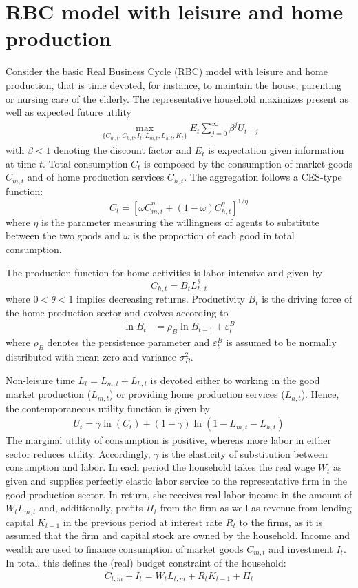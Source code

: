 \documentclass[a4paper]{scrartcl}
\begin{document}
\section{RBC model with leisure and home production}
Consider the basic Real Business Cycle (RBC) model with leisure and home production, that is time devoted, for instance, to maintain the house, parenting or nursing care of the elderly. The representative household maximizes present as well as expected future utility
\begin{align*}
\underset{\{C_{m,t},C_{h,t},I_{t},L_{m,t},L_{h,t},K_{t}\}}{\max} E_t \sum_{j=0}^{\infty} \beta^{j} U_{t+j}
\end{align*}
with $\beta <1$ denoting the discount factor and $E_t$ is expectation given information at time $t$. Total consumption $C_t$ is composed by the consumption of market goods $C_{m,t}$ and of home production services $C_{h,t}$. The aggregation follows a CES-type function:
$$C_t = \left[\omega C_{m,t}^\eta +(1-\omega)C_{h,t}^\eta\right]^{1/\eta}$$
where $\eta$ is the parameter measuring the willingness of agents to substitute between the two goods and $\omega$ is the proportion of each good in total consumption. 

The production function for home activities is labor-intensive and given by
$$C_{h,t}=B_t L_{h,t}^\theta$$
where $0<\theta<1$ implies decreasing returns. Productivity $B_t$ is the driving force of the home production sector and evolves according to
\begin{align*}
\ln{B_{t}} &= \rho_B \ln{B_{t-1}}  + \varepsilon_t^B
\end{align*}
where $\rho_B$ denotes the persistence parameter and $\varepsilon_t^B$ is assumed to be normally distributed with mean zero and variance $\sigma_B^2$.

Non-leisure time $L_t=L_{m,t}+L_{h,t}$ is devoted either to working in the good market production ($L_{m,t}$) or providing home production services ($L_{h,t}$). Hence, the contemporaneous utility function is given by
\begin{align*}
U_t = \gamma \ln(C_t) + (1-\gamma) \ln{(1-L_{m,t}-L_{h,t})}
\end{align*}
The marginal utility of consumption is positive, whereas more labor in either sector reduces utility. Accordingly, $\gamma$ is the elasticity of substitution between consumption and labor. In each period the household takes the real wage $W_t$ as given and supplies perfectly elastic labor service to the representative firm in the good production sector. In return, she receives real labor income in the amount of $W_t L_{m,t}$ and, additionally, profits $\Pi_t$ from the firm as well as revenue from lending capital $K_{t-1}$ in the previous period at interest rate $R_t$ to the firms, as it is assumed that the firm and capital stock are owned by the household. Income and wealth are used to finance consumption of market goods $C_{m,t}$ and investment $I_t$. In total, this defines the (real) budget constraint of the household:
\begin{align*}
C_{t,m} + I_t = W_t L_{t,m} + R_t K_{t-1} + \Pi_t
\end{align*}
\end{document}
